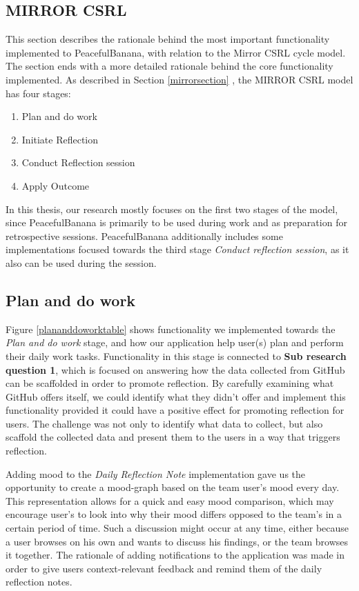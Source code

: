 \subsection{MIRROR CSRL}
\label{subsec:mirrorcsrl}
This section describes the rationale behind the most important functionality implemented to PeacefulBanana, with relation to the Mirror CSRL cycle model. The section ends with a more detailed rationale behind the core functionality implemented. As described in Section \ref{mirrorsection} , the MIRROR CSRL model has four stages: 
\begin{enumerate}
    \item Plan and do work
    \item Initiate Reflection
    \item Conduct Reflection session
    \item Apply Outcome
\end{enumerate}
In this thesis, our research mostly focuses on the first two stages of the model, since PeacefulBanana is primarily to be used during work and as preparation for retrospective sessions. PeacefulBanana additionally includes some implementations focused towards the third stage \emph{Conduct reflection session}, as it also can be used during the session. 

\subsection{Plan and do work}
Figure \ref{plananddoworktable} shows functionality we implemented towards the \emph{Plan and do work} stage, and how our application help user(s) plan and perform their daily work tasks. 
Functionality in this stage is connected to \textbf{Sub research question 1}, which is focused on answering how the data collected from GitHub can be scaffolded in order to promote reflection. By carefully examining what GitHub offers itself, we could identify what they didn't offer and implement this functionality provided it could have a positive effect for promoting reflection for users. The challenge was not only to identify what data to collect, but also scaffold the collected data and present them to the users in a way that triggers reflection. 

Adding mood to the \emph{Daily Reflection Note} implementation gave us the opportunity to create a mood-graph based on the team user's mood every day. This representation allows for a quick and easy mood comparison, which may encourage user's to look into why their mood differs opposed to the team's in a certain period of time. Such a discussion might occur at any time, either because a user browses on his own and wants to discuss his findings, or the team browses it together.  
The rationale of adding notifications to the application was made in order to give users context-relevant feedback and remind them of the daily reflection notes. 

